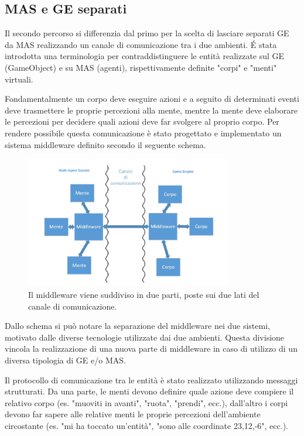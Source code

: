 \subsection{MAS e GE separati} \label{MAS_GE_separati}

Il secondo percorso si differenzia dal primo per la scelta di lasciare separati GE da MAS realizzando un canale di comunicazione tra i due ambienti. \'E stata introdotta una terminologia per contraddistinguere le entità realizzate sul GE (GameObject) e su MAS (agenti), rispettivamente definite "corpi" e "menti" virtuali. \cite{amslaurea12270}

\medskip

Fondamentalmente un corpo deve eseguire azioni e a seguito di determinati eventi deve trasmettere le proprie percezioni alla mente, mentre la mente deve elaborare le percezioni per decidere quali azioni deve far svolgere al proprio corpo. Per rendere possibile questa comunicazione è stato progettato e implementato un sistema middleware definito secondo il seguente schema.

\begin{figure}[H]
\centering
\includegraphics[width=9cm]{figures/Middleware_fuschini.png}
\caption{Il middleware viene suddiviso in due parti, poste sui due lati del canale di comunicazione. \cite{amslaurea12270}}
\end{figure}

Dallo schema si può notare la separazione del middleware nei due sistemi, motivato dalle diverse tecnologie utilizzate dai due ambienti.
Questa divisione vincola la realizzazione di una nuova parte di middleware in caso di utilizzo di un diversa tipologia di GE e/o MAS.
\medskip

Il protocollo di comunicazione tra le entità è stato realizzato utilizzando messaggi strutturati. Da una parte, le menti devono definire quale azione deve compiere il relativo corpo (es. "muoviti in avanti", "ruota", "prendi", ecc.), dall'altro i corpi devono far sapere alle relative menti le proprie percezioni dell'ambiente circostante (es. "mi ha toccato un'entità", "sono alle coordinate 23,12,-6", ecc.).\cite{amslaurea12270}
